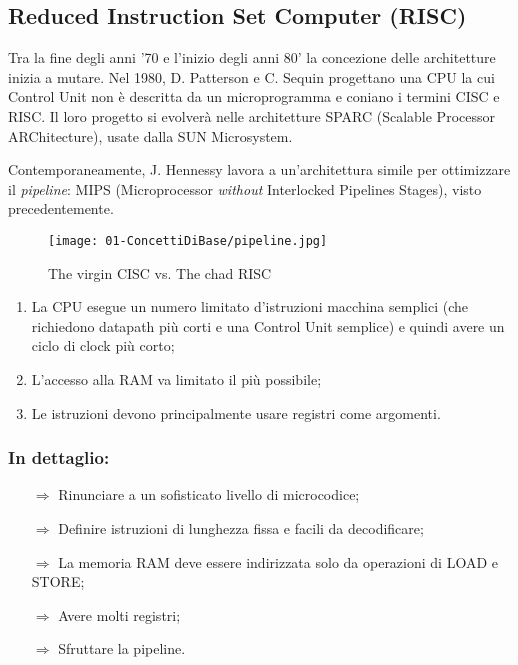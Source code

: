 \subsection{Reduced Instruction Set Computer (RISC)}

Tra la fine degli anni '70 e l'inizio degli anni 80' la concezione delle architetture inizia a mutare. Nel 1980, D. Patterson e C. Sequin progettano una CPU la cui Control Unit non è descritta da un microprogramma e coniano i termini CISC e RISC.
Il loro progetto si evolverà nelle architetture SPARC (Scalable Processor ARChitecture), usate dalla SUN Microsystem. 

Contemporaneamente, J. Hennessy lavora a un'architettura simile per ottimizzare il \textit{pipeline}: MIPS (Microprocessor \textit{without} Interlocked Pipelines Stages), visto precedentemente. 

\begin{figure}[h]
    \centering
    \texttt{[image: 01-ConcettiDiBase/pipeline.jpg]}
    \caption{The virgin CISC vs. The chad RISC}
\end{figure}


\begin{enumerate}
  \item La CPU esegue un numero limitato d'istruzioni macchina semplici (che richiedono datapath più corti e una Control Unit semplice) e quindi avere un ciclo di clock più corto;
  \item L'accesso alla RAM va limitato il più possibile;
  \item Le istruzioni devono principalmente usare registri come argomenti.
\end{enumerate}

\subsubsection{In dettaglio:}

\begin{itemize}
  \item [$\Rightarrow$] Rinunciare a un sofisticato livello di microcodice;
  \item [$\Rightarrow$] Definire istruzioni di lunghezza fissa e facili da decodificare;
  \item [$\Rightarrow$] La memoria RAM deve essere indirizzata solo da operazioni di LOAD e STORE;
  \item [$\Rightarrow$] Avere molti registri;
  \item [$\Rightarrow$] Sfruttare la pipeline.
\end{itemize}

